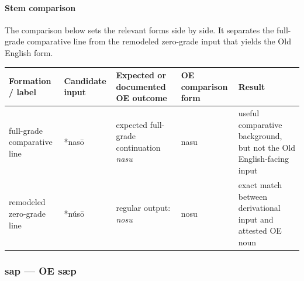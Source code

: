 \documentclass[
  british,
  a4paper,
]{article}
\newcounter{none} %
\begin{document}
\paragraph{Stem comparison}\label{stem-comparison-4}

The comparison below sets the relevant forms side by side. It separates
the full-grade comparative line from the remodeled zero-grade input that
yields the Old English form.

{\def\LTcaptype{none} %
\begin{longtable}[]{@{}
  >{\raggedright\arraybackslash}p{}
  >{\raggedright\arraybackslash}p{}
  >{\raggedright\arraybackslash}p{}
  >{\raggedright\arraybackslash}p{}
  >{\raggedright\arraybackslash}p{}@{}}
\toprule\noalign{}
\begin{minipage}[b]{\linewidth}\raggedright
Formation / label
\end{minipage} & \begin{minipage}[b]{\linewidth}\raggedright
Candidate input
\end{minipage} & \begin{minipage}[b]{\linewidth}\raggedright
Expected or documented OE outcome
\end{minipage} & \begin{minipage}[b]{\linewidth}\raggedright
OE comparison form
\end{minipage} & \begin{minipage}[b]{\linewidth}\raggedright
Result
\end{minipage} \\
\midrule\noalign{}
\endhead
\bottomrule\noalign{}
\endlastfoot
full-grade comparative line & *nasō & expected full-grade continuation
\emph{nasu} & nasu & useful comparative background, but not the Old
English-facing input \\
remodeled zero-grade line & *núsō & regular output: \emph{nosu} & nosu &
exact match between derivational input and attested OE noun \\
\end{longtable}
}

\subsubsection{sap --- OE sæp}\label{sap-oe-suxe6p}
\end{document}

